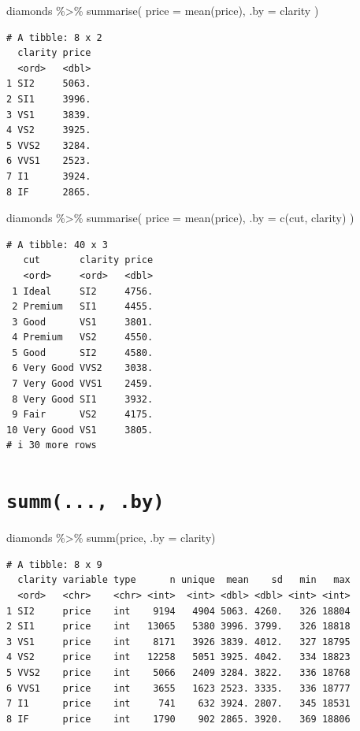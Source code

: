 \documentclass[
  letterpaper,
]{ctexbook}
\newenvironment{Shaded}{\begin{snugshade}}{\end{snugshade}}
\newcommand{\AttributeTok}[1]{\textcolor[rgb]{0.40,0.45,0.13}{#1}}
\newcommand{\FunctionTok}[1]{\textcolor[rgb]{0.28,0.35,0.67}{#1}}
\newcommand{\NormalTok}[1]{\textcolor[rgb]{0.00,0.23,0.31}{#1}}
\newcommand{\SpecialCharTok}[1]{\textcolor[rgb]{0.37,0.37,0.37}{#1}}
\begin{document}
\begin{Shaded}
\begin{Highlighting}[]
\NormalTok{diamonds }\SpecialCharTok{\%\textgreater{}\%}
  \FunctionTok{summarise}\NormalTok{(}
    \AttributeTok{price =} \FunctionTok{mean}\NormalTok{(price),}
    \AttributeTok{.by =}\NormalTok{ clarity}
\NormalTok{  )}
\end{Highlighting}
\end{Shaded}

\begin{verbatim}
# A tibble: 8 x 2
  clarity price
  <ord>   <dbl>
1 SI2     5063.
2 SI1     3996.
3 VS1     3839.
4 VS2     3925.
5 VVS2    3284.
6 VVS1    2523.
7 I1      3924.
8 IF      2865.
\end{verbatim}

\begin{Shaded}
\begin{Highlighting}[]
\NormalTok{diamonds }\SpecialCharTok{\%\textgreater{}\%}
  \FunctionTok{summarise}\NormalTok{(}
    \AttributeTok{price =} \FunctionTok{mean}\NormalTok{(price),}
    \AttributeTok{.by =} \FunctionTok{c}\NormalTok{(cut, clarity)}
\NormalTok{  )}
\end{Highlighting}
\end{Shaded}

\begin{verbatim}
# A tibble: 40 x 3
   cut       clarity price
   <ord>     <ord>   <dbl>
 1 Ideal     SI2     4756.
 2 Premium   SI1     4455.
 3 Good      VS1     3801.
 4 Premium   VS2     4550.
 5 Good      SI2     4580.
 6 Very Good VVS2    3038.
 7 Very Good VVS1    2459.
 8 Very Good SI1     3932.
 9 Fair      VS2     4175.
10 Very Good VS1     3805.
# i 30 more rows
\end{verbatim}

\hypertarget{summ...-.by}{%
\section{\texorpdfstring{\texttt{summ(...,\ .by)}}{summ(..., .by)}}\label{summ...-.by}}

\begin{Shaded}
\begin{Highlighting}[]
\NormalTok{diamonds }\SpecialCharTok{\%\textgreater{}\%}
  \FunctionTok{summ}\NormalTok{(price, }\AttributeTok{.by =}\NormalTok{ clarity)}
\end{Highlighting}
\end{Shaded}

\begin{verbatim}
# A tibble: 8 x 9
  clarity variable type      n unique  mean    sd   min   max
  <ord>   <chr>    <chr> <int>  <int> <dbl> <dbl> <int> <int>
1 SI2     price    int    9194   4904 5063. 4260.   326 18804
2 SI1     price    int   13065   5380 3996. 3799.   326 18818
3 VS1     price    int    8171   3926 3839. 4012.   327 18795
4 VS2     price    int   12258   5051 3925. 4042.   334 18823
5 VVS2    price    int    5066   2409 3284. 3822.   336 18768
6 VVS1    price    int    3655   1623 2523. 3335.   336 18777
7 I1      price    int     741    632 3924. 2807.   345 18531
8 IF      price    int    1790    902 2865. 3920.   369 18806
\end{verbatim}
\end{document}
